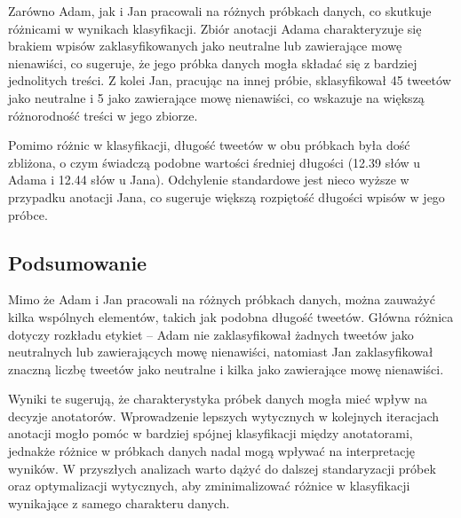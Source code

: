 \documentclass[12pt]{article}
\begin{document}
Zarówno Adam, jak i Jan pracowali na różnych próbkach danych, co skutkuje różnicami w wynikach klasyfikacji. Zbiór anotacji Adama charakteryzuje się brakiem wpisów zaklasyfikowanych jako neutralne lub zawierające mowę nienawiści, co sugeruje, że jego próbka danych mogła składać się z bardziej jednolitych treści. Z kolei Jan, pracując na innej próbie, sklasyfikował 45 tweetów jako neutralne i 5 jako zawierające mowę nienawiści, co wskazuje na większą różnorodność treści w jego zbiorze.

Pomimo różnic w klasyfikacji, długość tweetów w obu próbkach była dość zbliżona, o czym świadczą podobne wartości średniej długości (12.39 słów u Adama i 12.44 słów u Jana). Odchylenie standardowe jest nieco wyższe w przypadku anotacji Jana, co sugeruje większą rozpiętość długości wpisów w jego próbce.

\subsection{Podsumowanie}

Mimo że Adam i Jan pracowali na różnych próbkach danych, można zauważyć kilka wspólnych elementów, takich jak podobna długość tweetów. Główna różnica dotyczy rozkładu etykiet – Adam nie zaklasyfikował żadnych tweetów jako neutralnych lub zawierających mowę nienawiści, natomiast Jan zaklasyfikował znaczną liczbę tweetów jako neutralne i kilka jako zawierające mowę nienawiści.

Wyniki te sugerują, że charakterystyka próbek danych mogła mieć wpływ na decyzje anotatorów. Wprowadzenie lepszych wytycznych w kolejnych iteracjach anotacji mogło pomóc w bardziej spójnej klasyfikacji między anotatorami, jednakże różnice w próbkach danych nadal mogą wpływać na interpretację wyników. W przyszłych analizach warto dążyć do dalszej standaryzacji próbek oraz optymalizacji wytycznych, aby zminimalizować różnice w klasyfikacji wynikające z samego charakteru danych.
\end{document}
